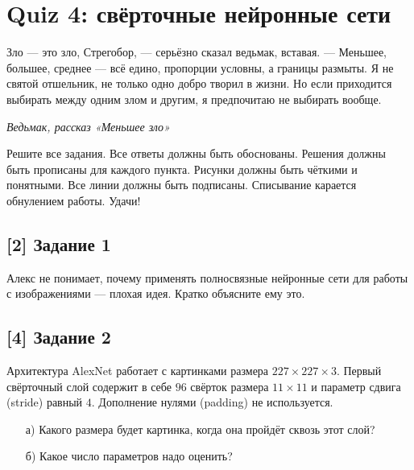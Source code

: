 \documentclass[12pt, a4paper, oneside]{article}
\begin{document}
\section*{Quiz 4: свёрточные нейронные сети}

\epigraph{Зло — это зло, Стрегобор, — серьёзно сказал ведьмак, вставая. — Меньшее, большее, среднее — всё едино, пропорции условны, а границы размыты. Я не святой отшельник, не только одно добро творил в жизни. Но если приходится выбирать между одним злом и другим, я предпочитаю не выбирать вообще.}{\textit{Ведьмак, рассказ «Меньшее зло»}}


Решите все задания. Все ответы должны быть обоснованы. Решения должны быть прописаны для каждого пункта. Рисунки должны быть чёткими и понятными. Все линии должны быть подписаны. Списывание карается обнулением работы.  Удачи! 

\vspace{-0.5cm}
\subsection*{[2] Задание 1}
\vspace{-0.5cm}

Алекс не понимает, почему применять полносвязные нейронные сети для работы с изображениями --- плохая идея. Кратко объясните ему это.

\vspace{-0.5cm}
\subsection*{[4] Задание 2}
\vspace{-0.5cm}

Архитектура AlexNet работает с картинками размера $227 \times 227 \times 3$.  Первый свёрточный слой содержит в себе $96$ свёрток размера $11 \times 11$ и параметр сдвига (stride) равный $4$. Дополнение нулями (padding) не используется. 

\begin{enumerate} 
    \item[а)]  Какого размера будет картинка, когда она пройдёт сквозь этот слой?  
    
    
    \item[б)] Какое число параметров надо оценить?
\end{enumerate}
\end{document}
